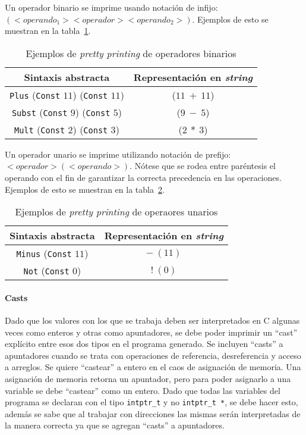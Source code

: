 Un operador binario se imprime usando notación de infijo: $(<operando_1> <operador> <operando_2>)$.
Ejemplos de esto se muestran en la tabla~\ref{tab:pretty_bin_op}.

\begin{table}[h!]
\centering
\begin{tabular}{|c|c|}
  \hline
  \textbf{Sintaxis abstracta} & \textbf{Representación en \textit{string}} \\ [0.5ex]
  \hline \hline
  \verb|Plus| (\verb|Const| $11$) (\verb|Const| $11$) & ($11\ +\ 11$) \\
  \verb|Subst| (\verb|Const| $9$) (\verb|Const| $5$) & ($9\ -\ 5$) \\
  \verb|Mult| (\verb|Const| $2$) (\verb|Const| $3$) & ($2\ *\ 3$) \\
  \hline
\end{tabular}

\caption{Ejemplos de \textit{pretty printing} de operadores binarios}
\label{tab:pretty_bin_op}
\end{table}

Un operador unario se imprime utilizando notación de prefijo: $<operador> (<operando>)$.
Nótese que se rodea entre paréntesis el operando con el fin de garantizar la correcta precedencia en las operaciones.
Ejemplos de esto se muestran en la tabla~\ref{tab:pretty_un_op}.

\begin{table}[h!]
\centering
\begin{tabular}{|c|c|}
  \hline
  \textbf{Sintaxis abstracta} & \textbf{Representación en \textit{string}} \\ [0.5ex]
  \hline \hline
  \verb|Minus| (\verb|Const| $11$) & $-\ (11)$ \\
  \verb|Not| (\verb|Const| $0$) & $!\ (0)$ \\
  \hline
\end{tabular}

\caption{Ejemplos de \textit{pretty printing} de operaores unarios}
\label{tab:pretty_un_op}
\end{table}

\paragraph*{Casts}
Dado que los valores con los que se trabaja deben ser interpretados en C algunas veces como enteros y otras como apuntadores, se debe poder imprimir un ``cast'' explícito entre esos dos tipos en el programa generado.
Se incluyen ``casts'' a apuntadores cuando se trata con operaciones de referencia, desreferencia y acceso a arreglos.
Se quiere ``castear'' a entero en el caos de asignación de memoria.
Una asignación de memoria retorna un apuntador, pero para poder asignarlo a una variable se debe ``castear'' como un entero.
Dado que todas las variables del programa se declaran con el tipo \verb|intptr_t| y no \verb|intptr_t *|, se debe hacer esto, además se sabe que al trabajar con direcciones las mismas serán interpretadas de la manera correcta ya que se agregan ``casts'' a apuntadores.


